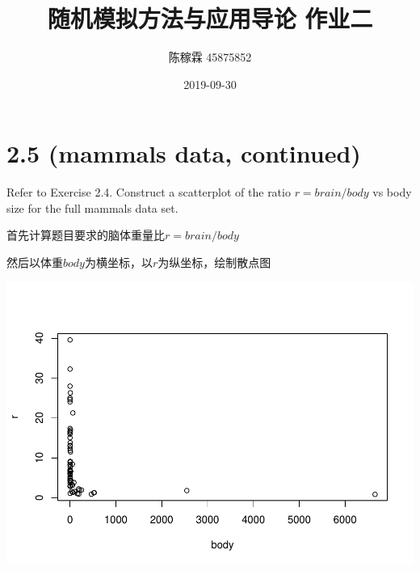 \documentclass[]{article}
\title{随机模拟方法与应用导论 作业二}
\author{陈稼霖 45875852}
\date{2019-09-30}
\newenvironment{Shaded}{\begin{snugshade}}{\end{snugshade}}
\newcommand{\DataTypeTok}[1]{\textcolor[rgb]{0.13,0.29,0.53}{#1}}
\newcommand{\KeywordTok}[1]{\textcolor[rgb]{0.13,0.29,0.53}{\textbf{#1}}}
\newcommand{\NormalTok}[1]{#1}
\newcommand{\OperatorTok}[1]{\textcolor[rgb]{0.81,0.36,0.00}{\textbf{#1}}}
\newcommand{\StringTok}[1]{\textcolor[rgb]{0.31,0.60,0.02}{#1}}
\begin{document}
\maketitle

\hypertarget{mammals-data-continued}{%
\section{2.5 (mammals data, continued)}\label{mammals-data-continued}}

Refer to Exercise 2.4. Construct a scatterplot of the ratio
\(r = brain/body\) vs body size for the full mammals data set.

首先计算题目要求的脑体重量比\(r=brain/body\)

\begin{Shaded}
\end{Shaded}

然后以体重\(body\)为横坐标，以\(r\)为纵坐标，绘制散点图

\begin{Shaded}
\end{Shaded}

\includegraphics{Homework_2_files/figure-latex/unnamed-chunk-2-1.pdf}
\end{document}
